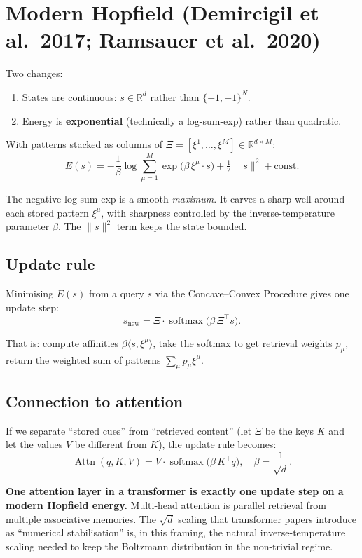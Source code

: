 \documentclass[11pt,a4paper]{article}
\begin{document}
\section{Modern Hopfield (Demircigil et al.~2017; Ramsauer et al.~2020)}

Two changes:

\begin{enumerate}
\item States are continuous: $s \in \mathbb{R}^d$ rather than
    $\{-1, +1\}^N$.
\item Energy is \textbf{exponential} (technically a log-sum-exp) rather
    than quadratic.
\end{enumerate}

With patterns stacked as columns of $\Xi = [\xi^1, \dots, \xi^M] \in
\mathbb{R}^{d \times M}$:
\[
E(s) = -\frac{1}{\beta} \log \sum_{\mu=1}^M \exp\!\bigl(\beta \, \xi^\mu \cdot s\bigr)
       + \tfrac{1}{2}\,\|s\|^2 + \text{const}.
\]

The negative log-sum-exp is a smooth \emph{maximum}. It carves a sharp
well around each stored pattern $\xi^\mu$, with sharpness controlled by
the inverse-temperature parameter $\beta$. The $\|s\|^2$ term keeps the
state bounded.

\subsection{Update rule}

Minimising $E(s)$ from a query $s$ via the Concave--Convex Procedure
gives one update step:
\[
s_{\text{new}} = \Xi \cdot \operatorname{softmax}\!\bigl(\beta \, \Xi^\top s\bigr).
\]

That is: compute affinities $\beta \langle s, \xi^\mu \rangle$, take the
softmax to get retrieval weights $p_\mu$, return the weighted sum of
patterns $\sum_\mu p_\mu \xi^\mu$.

\subsection{Connection to attention}

If we separate ``stored cues'' from ``retrieved content'' (let
$\Xi$ be the keys $K$ and let the values $V$ be different from $K$), the
update rule becomes:
\[
\operatorname{Attn}(q, K, V) = V \cdot \operatorname{softmax}\!\bigl(\beta \, K^\top q\bigr),
\quad \beta = \frac{1}{\sqrt{d}}.
\]

\textbf{One attention layer in a transformer is exactly one update step
on a modern Hopfield energy.} Multi-head attention is parallel retrieval
from multiple associative memories. The $\sqrt{d}$ scaling that
transformer papers introduce as ``numerical stabilisation'' is, in this
framing, the natural inverse-temperature scaling needed to keep the
Boltzmann distribution in the non-trivial regime.
\end{document}
